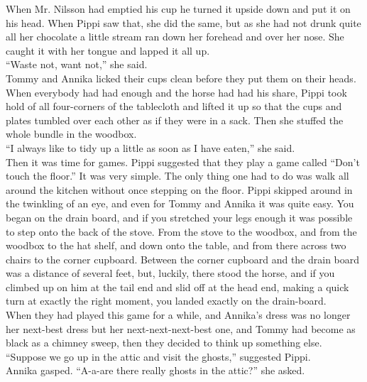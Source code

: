 \documentclass{standard}
\begin{document}
When Mr. Nilsson had emptied his cup he turned it upside down and put it on his head. When Pippi saw that, she did the same, but as she had not drunk quite all her chocolate a little stream ran down her forehead and over her nose. She caught it with her tongue and lapped it all up.\\

“Waste not, want not,” she said.\\

Tommy and Annika licked their cups clean before they put them on their heads.\\

When everybody had had enough and the horse had had his share, Pippi took hold of all four-corners of the tablecloth and lifted it up so that the cups and plates tumbled over each other as if they were in a sack. Then she stuffed the whole bundle in the woodbox.\\

“I always like to tidy up a little as soon as I have eaten,” she said.\\

Then it was time for games. Pippi suggested that they play a game called “Don’t touch the floor.” It was very simple. The only thing one had to do was walk all around the kitchen without once stepping on the floor. Pippi skipped around in the twinkling of an eye, and even for Tommy and Annika it was quite easy. You began on the drain board, and if you stretched your legs enough it was possible to step onto the back of the stove. From the stove to the woodbox, and from the woodbox to the hat shelf, and down onto the table, and from there across two chairs to the corner cupboard. Between the corner cupboard and the drain board was a distance of several feet, but, luckily, there stood the horse, and if you climbed up on him at the tail end and slid off at the head end, making a quick turn at exactly the right moment, you landed exactly on the drain-board.\\

When they had played this game for a while, and Annika’s dress was no longer her next-best dress but her next-next-next-best one, and Tommy had become as black as a chimney sweep, then they decided to think up something else.\\

“Suppose we go up in the attic and visit the ghosts,” suggested Pippi.\\

Annika gasped. “A-a-are there really ghosts in the attic?” she asked.\\
\end{document}
